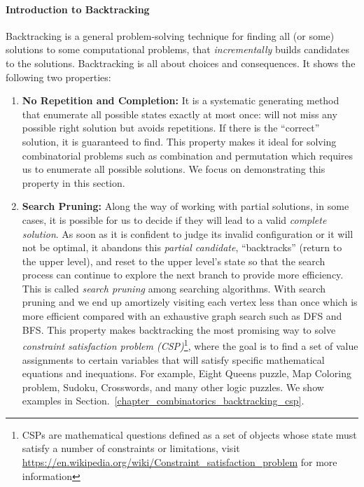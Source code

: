 \documentclass[../main.tex]{subfiles}
\begin{document}
\paragraph{Introduction to Backtracking} Backtracking is a general problem-solving technique for finding all (or some) solutions to some computational problems, that \textit{incrementally} builds candidates to the solutions. Backtracking is all about choices and consequences. It shows the following two properties:
 \begin{enumerate}
     \item \textbf{No Repetition and Completion:} It is a systematic generating method that enumerate all possible states exactly at most once: will not miss any possible right solution but  avoids repetitions. If there is the ``correct'' solution, it is guaranteed to find. This property makes it ideal for solving combinatorial problems such as combination and permutation which requires us to enumerate all possible solutions. We focus on demonstrating this property in this section. 
    \item \textbf{Search Pruning:} Along the way of working with partial solutions, in some cases, it is possible for us to decide if they will  lead to a valid \textit{complete solution}. As soon as it is confident to judge its invalid configuration or it will not be optimal, it abandons  this \textit{partial candidate}, ``backtracks'' (return to the upper level), and reset to the upper level's state so that the search process can continue to explore the next branch to provide more efficiency.  This is called \textit{search pruning} among searching algorithms.  With search pruning
and we end up amortizely visiting each vertex less than once which is more
efficient compared with an exhaustive graph search such as DFS and BFS.  This property makes backtracking the most promising way to solve \textit{constraint satisfaction problem (CSP)}\footnote{CSPs are mathematical questions defined as a set of objects whose state must satisfy a number of constraints or limitations, visit \url{https://en.wikipedia.org/wiki/Constraint_satisfaction_problem} for more information}, where the goal is to find a set of value assignments to certain variables that will satisfy specific mathematical equations and inequations. For example,  Eight Queens puzzle, Map Coloring problem, Sudoku, Crosswords, and many other logic puzzles. We show examples in Section.~\ref{chapter_combinatorics_backtracking_csp}.
 \end{enumerate}
\end{document}
